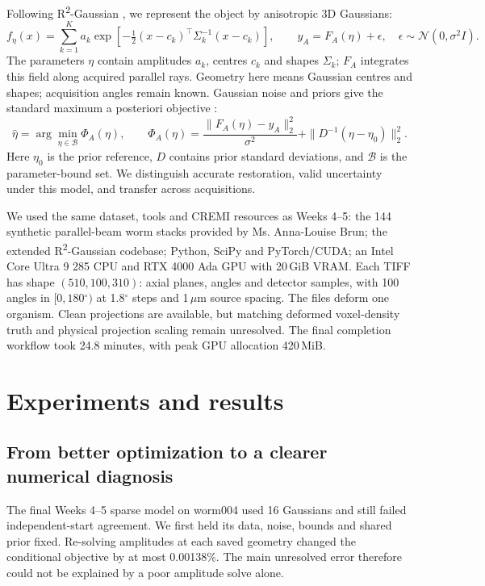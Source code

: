 \documentclass[11pt,a4paper]{article}
\newcommand{\Rtwo}{R\textsuperscript{2}-Gaussian}
\newcommand{\degree}{\ensuremath{^{\circ}}}
\begin{document}
Following \Rtwo{} \cite{r2}, we represent the object by anisotropic 3D Gaussians:
\begin{equation}
f_\eta(x)=\sum_{k=1}^{K}a_k\exp\!\left[-\tfrac12(x-c_k)^\top\Sigma_k^{-1}(x-c_k)\right],\qquad y_A=F_A(\eta)+\epsilon,\quad\epsilon\sim\mathcal N(0,\sigma^2I).
\label{eq:model}
\end{equation}
The parameters $\eta$ contain amplitudes $a_k$, centres $c_k$ and shapes $\Sigma_k$; $F_A$ integrates this field along acquired parallel rays. Geometry here means Gaussian centres and shapes; acquisition angles remain known. Gaussian noise and priors give the standard maximum a posteriori objective \cite{laplace}:
\begin{equation}
\widehat\eta=\arg\min_{\eta\in\mathcal B}\Phi_A(\eta),\qquad
\Phi_A(\eta)=\frac{\|F_A(\eta)-y_A\|_2^2}{\sigma^2}+\|D^{-1}(\eta-\eta_0)\|_2^2.
\label{eq:map}
\end{equation}
Here $\eta_0$ is the prior reference, $D$ contains prior standard deviations, and $\mathcal B$ is the parameter-bound set. We distinguish accurate restoration, valid uncertainty under this model, and transfer across acquisitions.

We used the same dataset, tools and CREMI resources as Weeks 4--5: the 144 synthetic parallel-beam worm stacks provided by Ms. Anna-Louise Brun; the extended \Rtwo{} codebase; Python, SciPy and PyTorch/CUDA; an Intel Core Ultra 9 285 CPU and RTX 4000 Ada GPU with 20\,GiB VRAM. Each TIFF has shape $(510,100,310)$: axial planes, angles and detector samples, with 100 angles in $[0,180\degree{})$ at 1.8\degree{} steps and 1\,$\mu$m source spacing. The files deform one organism. Clean projections are available, but matching deformed voxel-density truth and physical projection scaling remain unresolved. The final completion workflow took 24.8 minutes, with peak GPU allocation 420\,MiB.

\newpage
\section{Experiments and results}
\subsection{From better optimization to a clearer numerical diagnosis}
The final Weeks 4--5 sparse model on worm004 used 16 Gaussians and still failed independent-start agreement. We first held its data, noise, bounds and shared prior fixed. Re-solving amplitudes at each saved geometry changed the conditional objective by at most 0.00138\%. The main unresolved error therefore could not be explained by a poor amplitude solve alone.
\end{document}
